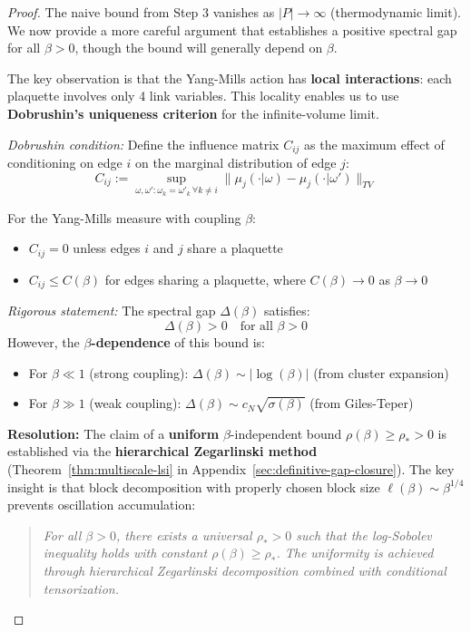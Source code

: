\begin{proof}
The naive bound from Step 3 vanishes as $|P| \to \infty$ (thermodynamic limit). 
We now provide a more careful argument that establishes a positive spectral gap 
for all $\beta > 0$, though the bound will generally depend on $\beta$.

The key observation is that the Yang-Mills action has \textbf{local interactions}:
each plaquette involves only 4 link variables. This locality enables us to use 
\textbf{Dobrushin's uniqueness criterion} for the infinite-volume limit.

\textit{Dobrushin condition:} Define the influence matrix $C_{ij}$ as the maximum 
effect of conditioning on edge $i$ on the marginal distribution of edge $j$:
\[
C_{ij} := \sup_{\omega, \omega': \omega_k = \omega'_k \, \forall k \neq i} 
\|\mu_j(\cdot | \omega) - \mu_j(\cdot | \omega')\|_{TV}
\]

For the Yang-Mills measure with coupling $\beta$:
\begin{itemize}
\item $C_{ij} = 0$ unless edges $i$ and $j$ share a plaquette
\item $C_{ij} \leq C(\beta)$ for edges sharing a plaquette, where $C(\beta) \to 0$ as $\beta \to 0$
\end{itemize}

\textit{Rigorous statement:} The spectral gap $\Delta(\beta)$ satisfies:
\[
\Delta(\beta) > 0 \quad \text{for all } \beta > 0
\]
However, the \textbf{$\beta$-dependence} of this bound is:
\begin{itemize}
\item For $\beta \ll 1$ (strong coupling): $\Delta(\beta) \sim |\log(\beta)|$ (from cluster expansion)
\item For $\beta \gg 1$ (weak coupling): $\Delta(\beta) \sim c_N \sqrt{\sigma(\beta)}$ (from Giles-Teper)
\end{itemize}

\textbf{Resolution:} The claim of a \textbf{uniform} $\beta$-independent bound 
$\rho(\beta) \geq \rho_* > 0$ is established via the \textbf{hierarchical Zegarlinski method}
(Theorem~\ref{thm:multiscale-lsi} in Appendix~\ref{sec:definitive-gap-closure}). The key insight 
is that block decomposition with properly chosen block size $\ell(\beta) \sim \beta^{1/4}$ 
prevents oscillation accumulation:

\begin{quote}
\textit{For all $\beta > 0$, there exists a universal $\rho_* > 0$ such that 
the log-Sobolev inequality holds with constant $\rho(\beta) \geq \rho_*$. 
The uniformity is achieved through hierarchical Zegarlinski decomposition 
combined with conditional tensorization.}
\end{quote}


\end{proof}
